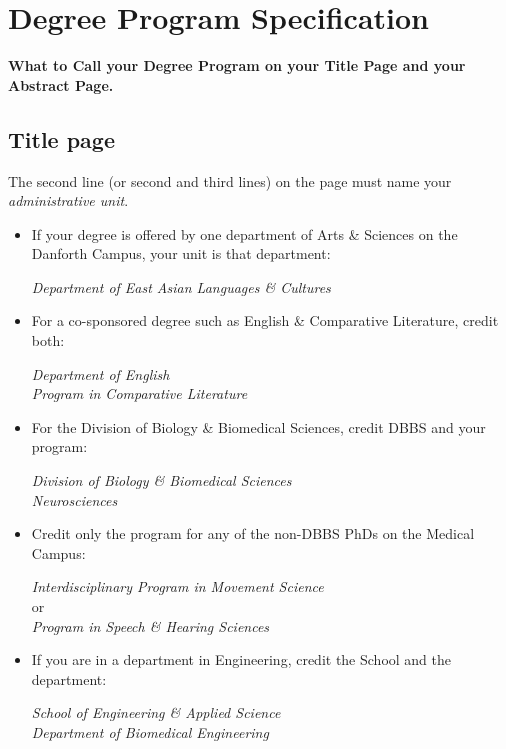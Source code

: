 \chapter{Degree Program Specification}
\label{app:degree-program}
\textbf{What to Call your Degree Program on your Title Page and your Abstract Page.}

\section{Title page}
The second line (or second and third lines) on the page must name your \emph{administrative unit}.

\begin{itemize}
\zerotrivseps   %
\item If your degree is offered by one department of Arts \& Sciences on the Danforth Campus, your unit is that department:
    \begin{center}
        \emph{Department of East Asian Languages \& Cultures}
    \end{center}

\item For a co-sponsored degree such as English \& Comparative Literature, credit both:
    \begin{center}
        \emph{Department of English}\\
        \emph{Program in Comparative Literature}
    \end{center}

\item For the Division of Biology \& Biomedical Sciences, credit DBBS and your program:
    \begin{center}
        \emph{Division of Biology \& Biomedical Sciences}\\
        \emph{Neurosciences}
    \end{center}

\item Credit only the program for any of the non-DBBS PhDs on the Medical Campus:
    \begin{center}
        \emph{Interdisciplinary Program in Movement Science}\\
        or\\
        \emph{Program in Speech \& Hearing Sciences}
    \end{center}

\pagebreak
\item If you are in a department in Engineering, credit the School and the department:
    \begin{center}
        \emph{School of Engineering \& Applied Science}\\
        \emph{Department of Biomedical Engineering}
    \end{center}


\end{itemize}
